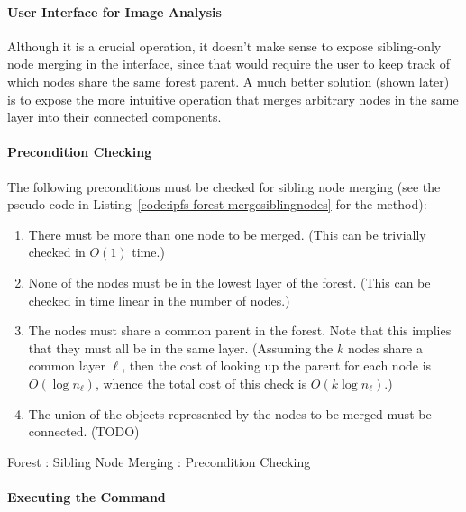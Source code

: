 \paragraph{User Interface for Image Analysis}

Although it is a crucial operation, it doesn't make sense to expose sibling-only node merging in the interface, since that would require the user to keep track of which nodes share the same forest parent. A much better solution (shown later) is to expose the more intuitive operation that merges arbitrary nodes in the same layer into their connected components.

\paragraph{Precondition Checking}

The following preconditions must be checked for sibling node merging (see the pseudo-code in Listing~\ref{code:ipfs-forest-mergesiblingnodes} for the method):

\begin{enumerate}

\item There must be more than one node to be merged. (This can be trivially checked in $O(1)$ time.)
\item None of the nodes must be in the lowest layer of the forest. (This can be checked in time linear in the number of nodes.)
\item The nodes must share a common parent in the forest. Note that this implies that they must all be in the same layer. (Assuming the $k$ nodes share a common layer $\ell$, then the cost of looking up the parent for each node is $O(\log n_\ell)$, whence the total cost of this check is $O(k \log n_\ell)$.)
\item The union of the objects represented by the nodes to be merged must be connected. (TODO)

\end{enumerate}

\begin{stulisting}[p]
\caption{Forest : Sibling Node Merging : Precondition Checking}
\label{code:ipfs-forest-mergesiblingnodes}

\end{stulisting}

\paragraph{Executing the Command}

